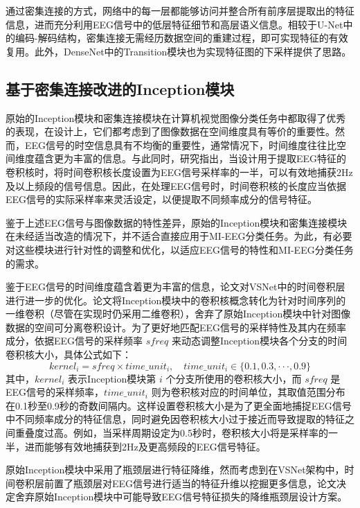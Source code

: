 通过密集连接的方式，网络中的每一层都能够访问并整合所有前序层提取出的特征信息，进而充分利用EEG信号中的低层特征细节和高层语义信息。相较于U-Net中的编码-解码结构，密集连接无需经历数据空间的重建过程，即可实现特征的有效复用。此外，DenseNet中的Transition模块也为实现特征图的下采样提供了思路。

\subsection{基于密集连接改进的Inception模块}

原始的Inception模块和密集连接模块在计算机视觉图像分类任务中都取得了优秀的表现，在设计上，它们都考虑到了图像数据在空间维度具有等价的重要性。然而，EEG信号的时空信息具有不均衡的重要性，通常情况下，时间维度往往比空间维度蕴含更为丰富的信息。与此同时，研究指出\cite{lawhern2018eegnet}，当设计用于提取EEG特征的卷积核时，将时间卷积核长度设置为EEG信号采样率的一半，可以有效地捕获2Hz及以上频段的信号信息。因此，在处理EEG信号时，时间卷积核的长度应当依据EEG信号的实际采样率来灵活设定，以便提取不同频率成分的信号特征。

鉴于上述EEG信号与图像数据的特性差异，原始的Inception模块和密集连接模块在未经适当改造的情况下，并不适合直接应用于MI-EEG分类任务。为此，有必要对这些模块进行针对性的调整和优化，以适应EEG信号的特性和MI-EEG分类任务的需求。

鉴于EEG信号的时间维度蕴含着更为丰富的信息，论文对VSNet中的时间卷积层进行进一步的优化。论文将Inception模块中的卷积核概念转化为针对时间序列的一维卷积（尽管在实现时仍采用二维卷积），舍弃了原始Inception模块中针对图像数据的空间可分离卷积设计。为了更好地匹配EEG信号的采样特性及其内在频率成分，依据EEG信号的采样频率 \(sfreq\) 来动态调整Inception模块各个分支的时间卷积核大小，具体公式如下：
\begin{equation}
  kernel_i = sfreq \times time\_unit_i, \quad time\_unit_i \in \{0.1, 0.3, ···, 0.9\}
  \label{eq:kernel_cal}
\end{equation}
其中，\(kernel_i\) 表示Inception模块第 \(i\) 个分支所使用的卷积核大小，而 \(sfreq\) 是EEG信号的采样频率，\(time\_unit_i\)  则为卷积核对应的时间单位，其取值范围分布在0.1秒至0.9秒的奇数间隔内。这样设置卷积核大小是为了更全面地捕捉EEG信号中不同频率成分的特征信息，同时避免因卷积核大小过于接近而导致提取的特征之间重叠度过高。例如，当采样周期设定为0.5秒时，卷积核大小将是采样率的一半，进而能够有效地捕获到2Hz及更高频段的EEG信号特征。


原始Inception模块中采用了瓶颈层进行特征降维，然而考虑到在VSNet架构中，时间卷积层前置了瓶颈层对EEG信号进行适当的特征升维以挖掘更多信息，论文决定舍弃原始Inception模块中可能导致EEG信号特征损失的降维瓶颈层设计方案。

